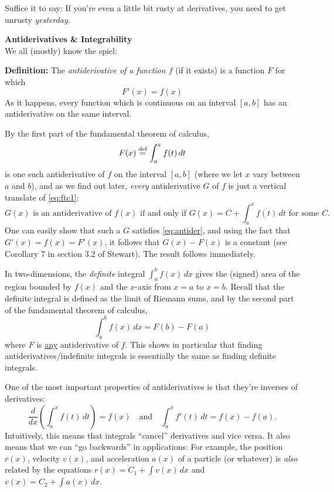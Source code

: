 \documentclass[12pt]{article}
\newcommand{\sectitle}[1]{\vspace{7.5mm}\noindent\textbf{\Large{#1}}\\[3mm]}
\begin{document}
	\noindent Suffice it to say: If you're even a little bit rusty at derivatives, you need to get unrusty \textit{yesterday}.
	
	\sectitle{Antiderivatives \& Integrability}
	We all (mostly) know the spiel:\vspace{6mm}
	
	\noindent\textbf{Definition:} The \textit{antiderivative of a function $f$} (if it exists) is a function $F$ for which
	\begin{equation}
		\label{eq:antider}
		F'(x)=f(x)
	\end{equation}
	As it happens, every function which is continuous on an interval $[a,b]$ has an antiderivative on the same interval.
	
	By the first part of the fundamental theorem of calculus,
	\begin{equation}
		\label{eq:ftc1}
		F(x)\overset{\text{def}}{=}\int_a^xf(t)\,dt
	\end{equation}
	is one such antiderivative of $f$ on the interval $[a,b]$ (where we let $x$ vary between $a$ and $b$), and as we find out later, \textit{every} antiderivative $G$ of $f$ is just a vertical translate of \eqref{eq:ftc1}:
	$$G(x)\text{ is an antiderivative of }f(x)\text{ if and only if }G(x)=C+\int_a^xf(t)\,dt\text{ for some }C.$$
	One can easily show that such a $G$ satisfies \eqref{eq:antider}, and using the fact that $G'(x)=f(x)=F'(x)$, it follows that $G(x)-F(x)$ is a constant (see Corollary 7 in section 3.2 of Stewart). The result follows immediately.
	
	In two-dimensions, the \textit{definite} integral $\int_a^b f(x)\,dx$ gives the (signed) area of the region bounded by $f(x)$ and the $x$-axis from $x=a$ to $x=b$. Recall that the definite integral is defined as the limit of Riemann sums, and by the second part of the fundamental theorem of calculus,
	$$\int_a^b f(x)\,dx=F(b)-F(a)$$
	where $F$ is \ul{any} antiderivative of $f$. This shows in particular that finding  antiderivatives/indefinite integrals is essentially the same as finding definite integrals.
	
	One of the most important properties of antiderivatives is that they're inverses of derivatives:
	$$\frac{d}{dx}\left(\int_a^x f(t)\,dt\right)=f(x)\quad\text{and}\quad \int_a^xf'(t)\,dt=f(x)-f(a).$$
	Intuitively, this means that integrals ``cancel'' derivatives and vice versa. It also means that we can ``go backwards'' in applications: For example, the position $r(x)$, velocity $v(x)$, and acceleration $a(x)$ of a particle (or whatever) is \textit{also} related by the equations $r(x)=C_1+\int v(x)\,dx$ and $v(x)=C_2+\int a(x)\,dx$.
	
\end{document}
